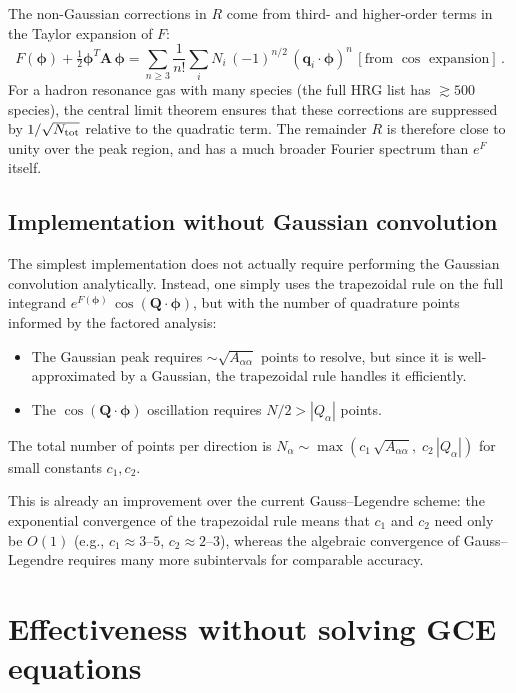 \documentclass[11pt,a4paper]{article}
\newcommand{\bphi}{\bm{\phi}}
\newcommand{\bq}{\bm{q}}
\newcommand{\bQ}{\bm{Q}}
\newcommand{\bA}{\bm{A}}
\begin{document}
The non-Gaussian corrections in $R$ come from third- and higher-order terms in the Taylor expansion of $F$:
\begin{equation}
  F(\bphi) + \tfrac{1}{2}\bphi^T \bA\,\bphi = \sum_{n \geq 3} \frac{1}{n!}\sum_i N_i\,(-1)^{n/2}\,(\bq_i \cdot \bphi)^n\,[\text{from }\cos\text{ expansion}]\,.
\end{equation}
For a hadron resonance gas with many species (the full HRG list has $\gtrsim 500$ species), the central limit theorem ensures that these corrections are suppressed by $1/\sqrt{N_{\rm tot}}$ relative to the quadratic term.
The remainder $R$ is therefore close to unity over the peak region, and has a much broader Fourier spectrum than $e^{F}$ itself.

\subsection{Implementation without Gaussian convolution}

The simplest implementation does not actually require performing the Gaussian convolution analytically.
Instead, one simply uses the trapezoidal rule on the full integrand $e^{F(\bphi)}\,\cos(\bQ \cdot \bphi)$, but with the number of quadrature points informed by the factored analysis:
\begin{itemize}
  \item The Gaussian peak requires $\sim \sqrt{A_{\alpha\alpha}}$ points to resolve, but since it is well-approximated by a Gaussian, the trapezoidal rule handles it efficiently.
  \item The $\cos(\bQ \cdot \bphi)$ oscillation requires $N/2 > |Q_\alpha|$ points.
\end{itemize}
The total number of points per direction is $N_\alpha \sim \max(c_1\,\sqrt{A_{\alpha\alpha}},\; c_2\,|Q_\alpha|)$ for small constants $c_1, c_2$.

This is already an improvement over the current Gauss--Legendre scheme: the exponential convergence of the trapezoidal rule means that $c_1$ and $c_2$ need only be $O(1)$ (e.g., $c_1 \approx 3$--$5$, $c_2 \approx 2$--$3$), whereas the algebraic convergence of Gauss--Legendre requires many more subintervals for comparable accuracy.


\section{Effectiveness without solving GCE equations}
\label{sec:without-gce}
\end{document}
